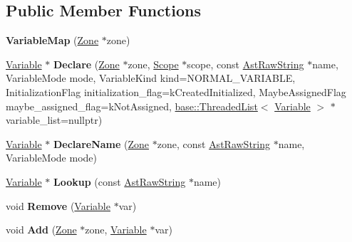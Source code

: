 \subsection*{Public Member Functions}
\begin{DoxyCompactItemize}
\item 
\mbox{\label{classv8_1_1internal_1_1VariableMap_a63d73a883f8b9f084e7872c3750cc671}} 
{\bfseries Variable\+Map} (\mbox{\hyperlink{classv8_1_1internal_1_1Zone}{Zone}} $\ast$zone)
\item 
\mbox{\label{classv8_1_1internal_1_1VariableMap_af55f380303e7123cb8423b590b559e0d}} 
\mbox{\hyperlink{classv8_1_1internal_1_1Variable}{Variable}} $\ast$ {\bfseries Declare} (\mbox{\hyperlink{classv8_1_1internal_1_1Zone}{Zone}} $\ast$zone, \mbox{\hyperlink{classv8_1_1internal_1_1Scope}{Scope}} $\ast$scope, const \mbox{\hyperlink{classv8_1_1internal_1_1AstRawString}{Ast\+Raw\+String}} $\ast$name, Variable\+Mode mode, Variable\+Kind kind=N\+O\+R\+M\+A\+L\+\_\+\+V\+A\+R\+I\+A\+B\+LE, Initialization\+Flag initialization\+\_\+flag=k\+Created\+Initialized, Maybe\+Assigned\+Flag maybe\+\_\+assigned\+\_\+flag=k\+Not\+Assigned, \mbox{\hyperlink{classv8_1_1base_1_1ThreadedListBase}{base\+::\+Threaded\+List}}$<$ \mbox{\hyperlink{classv8_1_1internal_1_1Variable}{Variable}} $>$ $\ast$variable\+\_\+list=nullptr)
\item 
\mbox{\label{classv8_1_1internal_1_1VariableMap_ab277e9aa7bb0ee5e1db0b60066406bab}} 
\mbox{\hyperlink{classv8_1_1internal_1_1Variable}{Variable}} $\ast$ {\bfseries Declare\+Name} (\mbox{\hyperlink{classv8_1_1internal_1_1Zone}{Zone}} $\ast$zone, const \mbox{\hyperlink{classv8_1_1internal_1_1AstRawString}{Ast\+Raw\+String}} $\ast$name, Variable\+Mode mode)
\item 
\mbox{\label{classv8_1_1internal_1_1VariableMap_a566cd8f5c461f1b0a6ab85b14d34228d}} 
\mbox{\hyperlink{classv8_1_1internal_1_1Variable}{Variable}} $\ast$ {\bfseries Lookup} (const \mbox{\hyperlink{classv8_1_1internal_1_1AstRawString}{Ast\+Raw\+String}} $\ast$name)
\item 
\mbox{\label{classv8_1_1internal_1_1VariableMap_ac6c6e6828edea4c8f7de2369eaf0d565}} 
void {\bfseries Remove} (\mbox{\hyperlink{classv8_1_1internal_1_1Variable}{Variable}} $\ast$var)
\item 
\mbox{\label{classv8_1_1internal_1_1VariableMap_a19cae5e7bece0ca5a91ed588236491ed}} 
void {\bfseries Add} (\mbox{\hyperlink{classv8_1_1internal_1_1Zone}{Zone}} $\ast$zone, \mbox{\hyperlink{classv8_1_1internal_1_1Variable}{Variable}} $\ast$var)
\end{DoxyCompactItemize}
